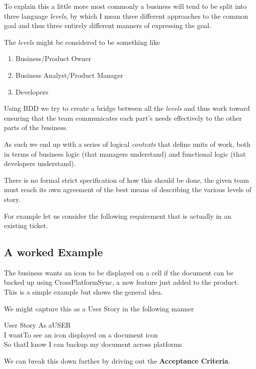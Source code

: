 \documentclass[a4paper, titlepage]{article}
\begin{document}
  To explain this a little more most commonly a business will tend to be split
  into three language \textit{levels}, by which I mean three different approaches
  to the common goal and thus three entirely different manners of
  expressing the goal.

  The \textit{levels} might be considered to be something like
  
  \begin{enumerate}
    \item{Business/Product Owner}
    \item{Business Analyst/Product Manager}
    \item{Developers}
  \end{enumerate}
  
  Using BDD we try to create a bridge between all the \textit{levels} and thus
  work toward ensuring that the team communicates each part's needs
  effectively to the other parts of the business. 

  As such we end up with a series of logical \textit{contexts} that define
  units of work, both in terms of business logic (that managers
  understand) and functional logic (that developers understand).

  There is no formal strict specification of how this should be done,
  the given team must reach its own agreement of the best means of
  describing the various levels of story.

  For example let us consider the following requirement that is actually
  in an existing ticket. 

  \subsection{A worked Example}

  The business wants an icon to be displayed on a cell if the document can be backed
  up using CrossPlatformSync, a new feature just added to the product. 
  This is a simple example but shows the general idea.

  We might capture this as a User Story in the following manner
  \begin{tspec}{1.0}{User Story}
    \centering
      \ac{As a}{USER}\\
      \ac{I want}{To see an icon displayed on a document icon}\\
      \ac{So that}{I know I can backup my document across platforms}
  \end{tspec}

  We can break this down further by driving out the \textbf{Acceptance
  Criteria}.
  
\end{document}

